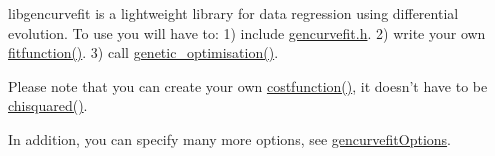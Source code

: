 libgencurvefit is a lightweight library for data regression using differential evolution. To use you will have to: 1) include \hyperlink{gencurvefit_8h}{gencurvefit.h}. 2) write your own \hyperlink{gencurvefit_8h_a7a7ea9c36bfca151fe1556d1f5e61c26}{fitfunction()}. 3) call \hyperlink{gencurvefit_8c_ae2b325ec90b9cad5ca726d96d7a277e5}{genetic\_\-optimisation()}.

Please note that you can create your own \hyperlink{gencurvefit_8h_a655dc6f3bd77f814c6127a0556709cfe}{costfunction()}, it doesn't have to be \hyperlink{gencurvefit_8c_a4b14e8f032e637096d2f1e3327f8e4a8}{chisquared()}.

In addition, you can specify many more options, see \hyperlink{structgencurvefit_options}{gencurvefitOptions}. 
